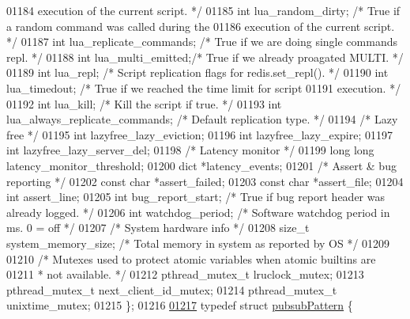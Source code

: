 \begin{DoxyCode}
{{{{{{{01184 \textcolor{comment}{                             execution of the current script. */}
01185     \textcolor{keywordtype}{int} lua\_random\_dirty; \textcolor{comment}{/* True if a random command was called during the}
01186 \textcolor{comment}{                             execution of the current script. */}
01187     \textcolor{keywordtype}{int} lua\_replicate\_commands; \textcolor{comment}{/* True if we are doing single commands repl. */}
01188     \textcolor{keywordtype}{int} lua\_multi\_emitted;\textcolor{comment}{/* True if we already proagated MULTI. */}
01189     \textcolor{keywordtype}{int} lua\_repl;         \textcolor{comment}{/* Script replication flags for redis.set\_repl(). */}
01190     \textcolor{keywordtype}{int} lua\_timedout;     \textcolor{comment}{/* True if we reached the time limit for script}
01191 \textcolor{comment}{                             execution. */}
01192     \textcolor{keywordtype}{int} lua\_kill;         \textcolor{comment}{/* Kill the script if true. */}
01193     \textcolor{keywordtype}{int} lua\_always\_replicate\_commands; \textcolor{comment}{/* Default replication type. */}
01194     \textcolor{comment}{/* Lazy free */}
01195     \textcolor{keywordtype}{int} lazyfree\_lazy\_eviction;
01196     \textcolor{keywordtype}{int} lazyfree\_lazy\_expire;
01197     \textcolor{keywordtype}{int} lazyfree\_lazy\_server\_del;
01198     \textcolor{comment}{/* Latency monitor */}
01199     \textcolor{keywordtype}{long} \textcolor{keywordtype}{long} latency\_monitor\_threshold;
01200     dict *latency\_events;
01201     \textcolor{comment}{/* Assert & bug reporting */}
01202     \textcolor{keyword}{const} \textcolor{keywordtype}{char} *assert\_failed;
01203     \textcolor{keyword}{const} \textcolor{keywordtype}{char} *assert\_file;
01204     \textcolor{keywordtype}{int} assert\_line;
01205     \textcolor{keywordtype}{int} bug\_report\_start; \textcolor{comment}{/* True if bug report header was already logged. */}
01206     \textcolor{keywordtype}{int} watchdog\_period;  \textcolor{comment}{/* Software watchdog period in ms. 0 = off */}
01207     \textcolor{comment}{/* System hardware info */}
01208     size\_t system\_memory\_size;  \textcolor{comment}{/* Total memory in system as reported by OS */}
01209 
01210     \textcolor{comment}{/* Mutexes used to protect atomic variables when atomic builtins are}
01211 \textcolor{comment}{     * not available. */}
01212     pthread\_mutex\_t lruclock\_mutex;
01213     pthread\_mutex\_t next\_client\_id\_mutex;
01214     pthread\_mutex\_t unixtime\_mutex;
01215 \};
01216 
\hyperlink{structpubsubPattern}{01217} \textcolor{keyword}{typedef} \textcolor{keyword}{struct} \hyperlink{structpubsubPattern}{pubsubPattern} \{
}}}}}}}
\end{DoxyCode}
